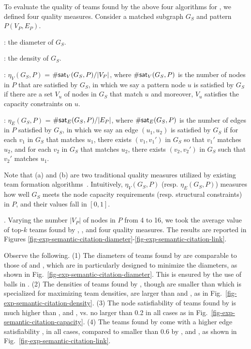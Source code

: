 To evaluate the quality of teams found by the above four algorithms for \teamF, we defined four quality measures. 
Consider a matched subgraph $G_S$ and pattern $P(V_P, E_P)$.

: the diameter of $G_S$.

: the density of $G_S$.

: $\eta_V(G_S, P)$ = $\#{\mathsf{sat}}_V(G_S, P) / |V_P|$, where $\#{\mathsf{sat}}_V(G_S, P)$ is the number of nodes in $P$ that are satisfied by $G_S$, in which we say a pattern node $u$ is satisfied by $G_S$ if there are a set $V_u$ of nodes in $G_S$ that match $u$ and moreover, $V_u$ satisfies the capacity constraints on $u$.

: $\eta_E(G_S, P)$ = $\#{\mathsf{sat}}_E(G_S,P)/|E_P|$, where $\#{\mathsf{sat}}_E(G_S,P)$ is the number of edges in $P$ satisfied by $G_S$, in which we say an edge $(u_1, u_2)$ is satisfied by $G_S$ if for each $v_1$ in $G_S$ that matches $u_1$,
there exists $(v_1, v_1')$ in $G_S$ so that $v_1'$ matches $u_2$, and for each  $v_2$ in $G_S$ that matches $u_2$, there exists $(v_2, v_2')$ in $G_S$ such that $v_2'$ matches $u_1$.


Note that (a) and (b) are two traditional quality measures utilized by existing team formation algorithms~\cite{GajewarS12,realTeamForm13,Lappas09,Kargar11}.
Intuitively, $\eta_V(G_S, P)$ (resp. $\eta_E(G_S,P)$) measures how well $G_S$ meets the node capacity requirements (resp. structural constraints) in $P$, and their values fall in $[0, 1]$.



. Varying the number $|V_{P}|$ of
nodes in $P$ from 4 to 16, we took the average value of top-$k$ teams found by  \optgrouprec, \mindia, \minsumdis and \denalk \wrt four quality measures.
The results are reported in Figures \ref{fig-exp-semantic-citation-diameter}-\ref{fig-exp-semantic-citation-link}.

Observe the following.
(1) The diameters of teams found by \optgrouprec are comparable to those of \mindia and \minsumdis, which are in particularly designed to minimize the diameters, as shown in Fig.~\ref{fig-exp-semantic-citation-diameter}. This is ensured by the use of balls in \optgrouprec.
(2) The densities of teams found by \optgrouprec, though are smaller than \denalk which is specialized for maximizing team densities, are larger than \mindia and \minsumdis, as in Fig.~\ref{fig-exp-semantic-citation-density}.
(3) The node satisfiability of teams found by \optgrouprec is much higher than \mindia, \minsumdis and \denalk,  vs. no larger than 0.2 in all cases as in Fig.~\ref{fig-exp-semantic-citation-capacity}.
(4) The teams found by \optgrouprec come with a higher edge satisfiability ,  in all cases, compared to smaller than 0.6 by \mindia, \minsumdis and \denalk, as shown in Fig.~\ref{fig-exp-semantic-citation-link}.

